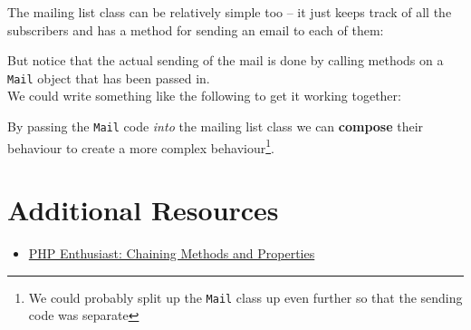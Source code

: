 The mailing list class can be relatively simple too – it just keeps track of all the subscribers and has a method for sending an email to each of them:


But notice that the actual sending of the mail is done by calling methods on a \texttt{Mail} object that has been passed in.
\\

We could write something like the following to get it working together:



By passing the \texttt{Mail} code \textit{into} the mailing list class we can \textbf{compose} their behaviour to create a more complex behaviour\footnote{We could probably split up the \texttt{Mail} class up even further so that the sending code was separate}.


\section{Additional Resources}

\begin{itemize}[leftmargin=*]
    \item \href{ https://phpenthusiast.com/object-oriented-php-tutorials/chaining-methods-and-properties}{PHP Enthusiast: Chaining Methods and Properties}
\end{itemize}
